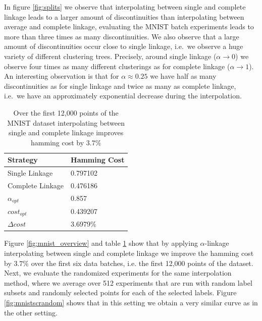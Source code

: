 In figure \ref{fig:splits} we observe that interpolating between single and complete linkage leads to a larger amount of discontinuities than interpolating between average and complete linkage, evaluating the MNIST batch experiments leads to more than three times as many discontinuities. We also observe that a large amount of discontinuities occur close to single linkage, i.e.\ we observe a huge variety of different clustering trees. Precisely, around single linkage ($\alpha \rightarrow 0$) we observe four times as many different clusterings as for complete linkage ($\alpha \rightarrow 1$). An interesting observation is that for $\alpha \approx 0.25$ we have half as many discontinuities as for single linkage and twice as many as complete linkage,  i.e.\ we have an approximately exponential decrease during the interpolation.

\begin{table}[H]
    \centering
    \begin{tabular}{|l | l |}
    \hline
    Strategy & Hamming Cost\\ \hline
    Single Linkage & 0.797102\\
    Complete Linkage & 0.476186\\
    $\alpha_{opt}$ & 0.857\\
    $cost_{opt}$ & 0.439207\\
    $\Delta cost$ & 3.6979\%\\\hline
    \end{tabular}
    \caption{Over the first 12,000 points of the MNIST dataset interpolating between single and complete linkage improves hamming cost by $3.7\%$ }
    \label{table:mnist1000avgsc}
\end{table}

Figure \ref{fig:mnist_overview} and table \ref{table:mnist1000avgsc} show that by applying $\alpha$-linkage interpolating between single and complete linkage we improve the hamming cost by $3.7\%$ over the first six data batches, i.e. the first 12,000 points of the dataset. Next, we evaluate the randomized experiments for the same interpolation method, where we average over 512 experiments that are run with random label subsets and randomly selected points for each of the selected labels. Figure \ref{fig:mnistscrandom} shows that in this setting we obtain a very similar curve as in the other setting.

